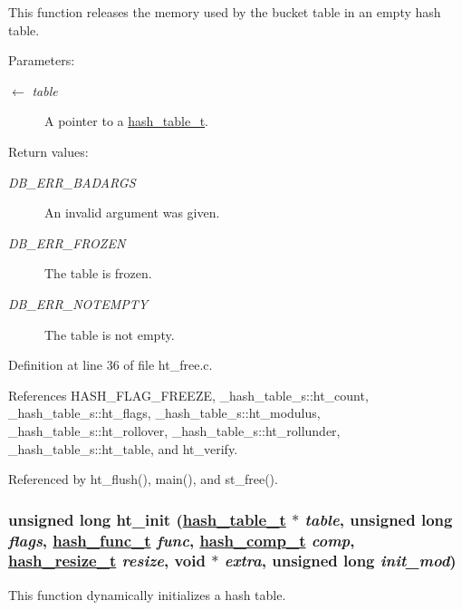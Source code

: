 This function releases the memory used by the bucket table in an empty hash table.

\begin{Desc}
\item[Parameters:]
\begin{description}
\item[\mbox{$\leftarrow$} {\em table}]A pointer to a \hyperlink{group__dbprim__hash_ga1}{hash\_\-table\_\-t}.\end{description}
\end{Desc}
\begin{Desc}
\item[Return values:]
\begin{description}
\item[{\em DB\_\-ERR\_\-BADARGS}]An invalid argument was given. \item[{\em DB\_\-ERR\_\-FROZEN}]The table is frozen. \item[{\em DB\_\-ERR\_\-NOTEMPTY}]The table is not empty.\end{description}
\end{Desc}


Definition at line 36 of file ht\_\-free.c.

References HASH\_\-FLAG\_\-FREEZE, \_\-hash\_\-table\_\-s::ht\_\-count, \_\-hash\_\-table\_\-s::ht\_\-flags, \_\-hash\_\-table\_\-s::ht\_\-modulus, \_\-hash\_\-table\_\-s::ht\_\-rollover, \_\-hash\_\-table\_\-s::ht\_\-rollunder, \_\-hash\_\-table\_\-s::ht\_\-table, and ht\_\-verify.

Referenced by ht\_\-flush(), main(), and st\_\-free().\hypertarget{group__dbprim__hash_ga9}{
\subsubsection[ht\_\-init]{\setlength{\rightskip}{0pt plus 5cm}unsigned long ht\_\-init (\hyperlink{struct__hash__table__s}{hash\_\-table\_\-t} $\ast$ {\em table}, unsigned long {\em flags}, \hyperlink{group__dbprim__hash_ga4}{hash\_\-func\_\-t} {\em func}, \hyperlink{group__dbprim__hash_ga5}{hash\_\-comp\_\-t} {\em comp}, \hyperlink{group__dbprim__hash_ga6}{hash\_\-resize\_\-t} {\em resize}, void $\ast$ {\em extra}, unsigned long {\em init\_\-mod})}}
\label{group__dbprim__hash_ga9}


This function dynamically initializes a hash table.

